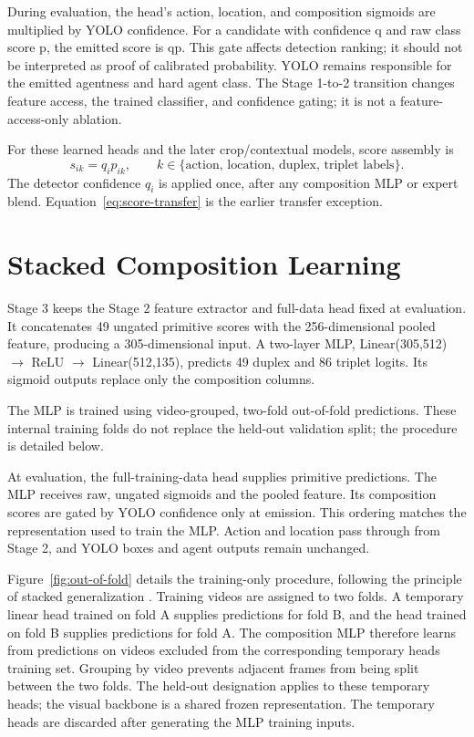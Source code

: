During evaluation, the head’s action, location, and composition sigmoids are multiplied by YOLO confidence. For a candidate with confidence q and raw class score p, the emitted score is qp. This gate affects detection ranking; it should not be interpreted as proof of calibrated probability. YOLO remains responsible for the emitted agentness and hard agent class. The Stage 1-to-2 transition changes feature access, the trained classifier, and confidence gating; it is not a feature-access-only ablation.

For these learned heads and the later crop/contextual models, score assembly is
\begin{equation}\label{eq:score-assembly}
 s_{ik}=q_i p_{ik},\qquad k\in\{\text{action, location, duplex, triplet labels}\}.
\end{equation}
The detector confidence \(q_i\) is applied once, after any composition MLP or expert blend. Equation~\ref{eq:score-transfer} is the earlier transfer exception.

\section{Stacked Composition Learning}

Stage 3 keeps the Stage 2 feature extractor and full-data head fixed at evaluation. It concatenates 49 ungated primitive scores with the 256-dimensional pooled feature, producing a 305-dimensional input. A two-layer MLP, Linear(305,512) \(\rightarrow\) ReLU \(\rightarrow\) Linear(512,135), predicts 49 duplex and 86 triplet logits. Its sigmoid outputs replace only the composition columns.

The MLP is trained using video-grouped, two-fold out-of-fold predictions. These internal training folds do not replace the held-out validation split; the procedure is detailed below.

At evaluation, the full-training-data head supplies primitive predictions. The MLP receives raw, ungated sigmoids and the pooled feature. Its composition scores are gated by YOLO confidence only at emission. This ordering matches the representation used to train the MLP. Action and location pass through from Stage 2, and YOLO boxes and agent outputs remain unchanged.

Figure~\ref{fig:out-of-fold} details the training-only procedure, following the principle of stacked generalization \cite{stacking}. Training videos are assigned to two folds. A temporary linear head trained on fold A supplies predictions for fold B, and the head trained on fold B supplies predictions for fold A. The composition MLP therefore learns from predictions on videos excluded from the corresponding temporary head\textquotesingle{}s training set. Grouping by video prevents adjacent frames from being split between the two folds. The held-out designation applies to these temporary heads; the visual backbone is a shared frozen representation. The temporary heads are discarded after generating the MLP training inputs.

